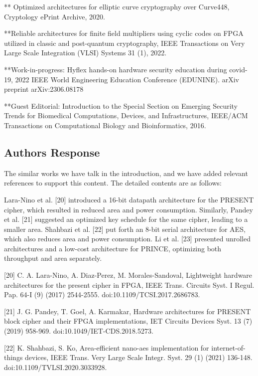 ** Optimized architectures for elliptic curve cryptography over Curve448, Cryptology ePrint Archive, 2020.

**Reliable architectures for finite field multipliers using cyclic codes on FPGA utilized in classic and post-quantum cryptography, IEEE Transactions on Very Large Scale Integration (VLSI) Systems 31 (1), 2022.

**Work-in-progress: Hyflex hands-on hardware security education during covid-19, 2022 IEEE World Engineering Education Conference (EDUNINE).
arXiv preprint arXiv:2306.08178

**Guest Editorial: Introduction to the Special Section on Emerging Security Trends for Biomedical Computations, Devices, and Infrastructures, IEEE/ACM Transactions on Computational Biology and Bioinformatics, 2016.


\subsection{Authors Response}

The similar works we have talk in the introduction, and we have added relevant references to support this content. The detailed contents are as follows:

\color{blue}

Lara-Nino et al. [20] introduced a 16-bit datapath architecture for the PRESENT cipher, which resulted in reduced area and power consumption. Similarly, Pandey et al. [21] suggested an optimized key schedule for the same cipher, leading to a smaller area. Shahbazi et al. [22] put forth an 8-bit serial architecture for AES, which also reduces area and power consumption. Li et al. [23] presented unrolled architectures and a low-cost architecture for PRINCE, optimizing both throughput and area separately.

	[20] C. A. Lara-Nino, A. Diaz-Perez, M. Morales-Sandoval, Lightweight hardware architectures for the present cipher in FPGA, IEEE Trans. Circuits Syst. I Regul. Pap. 64-I (9) (2017) 2544-2555. doi:10.1109/TCSI.2017.2686783.

[21] J. G. Pandey, T. Goel, A. Karmakar, Hardware architectures for PRESENT block cipher and their FPGA implementations, IET Circuits Devices Syst. 13 (7) (2019) 958-969. doi:10.1049/IET-CDS.2018.5273.

[22] K. Shahbazi, S. Ko, Area-efficient nano-aes implementation for internet-of-things devices, IEEE Trans. Very Large Scale Integr. Syst. 29 (1) (2021) 136-148. doi:10.1109/TVLSI.2020.3033928.

